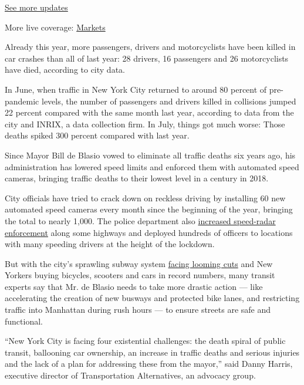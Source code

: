 \href{https://www.nytimes3xbfgragh.onion/2020/09/11/world/covid-19-coronavirus.html?action=click\&pgtype=Article\&state=default\&region=MAIN_CONTENT_1\&context=storylines_live_updates}{See
more updates}

More live coverage:
\href{https://www.nytimes3xbfgragh.onion/live/2020/09/11/business/stock-market-today-coronavirus?action=click\&pgtype=Article\&state=default\&region=MAIN_CONTENT_1\&context=storylines_live_updates}{Markets}

Already this year, more passengers, drivers and motorcyclists have been
killed in car crashes than all of last year: 28 drivers, 16 passengers
and 26 motorcyclists have died, according to city data.

In June, when traffic in New York City returned to around 80 percent of
pre-pandemic levels, the number of passengers and drivers killed in
collisions jumped 22 percent compared with the same month last year,
according to data from the city and INRIX, a data collection firm. In
July, things got much worse: Those deaths spiked 300 percent compared
with last year.

Since Mayor Bill de Blasio vowed to eliminate all traffic deaths six
years ago, his administration has lowered speed limits and enforced them
with automated speed cameras, bringing traffic deaths to their lowest
level in a century in 2018.

City officials have tried to crack down on reckless driving by
installing 60 new automated speed cameras every month since the
beginning of the year, bringing the total to nearly 1,000. The police
department also
\href{https://www.nytimes3xbfgragh.onion/2020/04/16/nyregion/coronavirus-nyc-speeding.html}{increased
speed-radar enforcement} along some highways and deployed hundreds of
officers to locations with many speeding drivers at the height of the
lockdown.

But with the city's sprawling subway system
\href{https://www.nytimes3xbfgragh.onion/2020/08/26/nyregion/nyc-subway-bus-service-cuts.html}{facing
looming cuts} and New Yorkers buying bicycles, scooters and cars in
record numbers, many transit experts say that Mr. de Blasio needs to
take more drastic action --- like accelerating the creation of new
busways and protected bike lanes, and restricting traffic into Manhattan
during rush hours --- to ensure streets are safe and functional.

``New York City is facing four existential challenges: the death spiral
of public transit, ballooning car ownership, an increase in traffic
deaths and serious injuries and the lack of a plan for addressing these
from the mayor,'' said Danny Harris, executive director of
Transportation Alternatives, an advocacy group.

